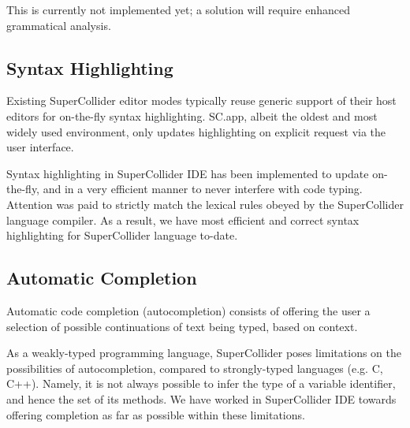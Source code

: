 \documentclass[11pt,a4paper]{article}
\begin{document}
This is currently not implemented yet; a solution will require enhanced grammatical analysis.

\subsection{Syntax Highlighting}

Existing SuperCollider editor modes typically reuse generic support of their host editors for
on-the-fly syntax highlighting. SC.app, albeit the oldest and most widely used environment, only
updates highlighting on explicit request via the user interface.

Syntax highlighting in SuperCollider IDE has been implemented to update on-the-fly, and in a very
efficient manner to never interfere with code typing. Attention was paid to strictly match the
lexical rules obeyed by the SuperCollider language compiler. As a result, we have most efficient and
correct syntax highlighting for SuperCollider language to-date.

\subsection{Automatic Completion}

Automatic code completion (autocompletion) consists of offering the user a selection of possible
continuations of text being typed, based on context.

As a weakly-typed programming language, SuperCollider poses limitations on the possibilities of
autocompletion, compared to strongly-typed languages (e.g. C, C++). Namely, it is not always
possible to infer the type of a variable identifier, and hence the set of its methods. We have
worked in SuperCollider IDE towards offering completion as far as possible within these limitations.
\end{document}
